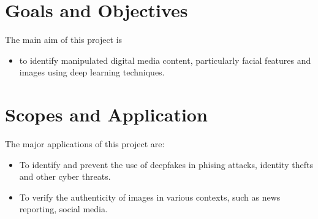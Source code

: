     \section{Goals and Objectives}
        The main aim of this project is 
        \begin{itemize}
            \item to identify manipulated digital media content, particularly facial features and images using deep learning techniques.
        \end{itemize}
    
    \section{Scopes and Application}
        The major applications of this project are:
        \begin{itemize}
            \item To identify and prevent the use of deepfakes in phising attacks, identity thefts and other cyber threats.
            \item To verify the authenticity of images in various contexts, such as news reporting, social media.  
        \end{itemize}
    